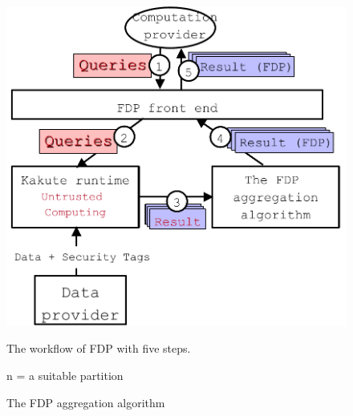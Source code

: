 \begin{figure}[!htb]
    \begin{minipage}{0.44\textwidth}
        \includegraphics[width=0.3\textheight]{figures/selective_arch.pdf}
        \vspace{-.1in}
        \caption{The workflow of FDP with five steps.}
        \label{fig:vm-tree}
    \end{minipage}
    \begin{minipage}{0.54\textwidth}
      \vspace{-.2in}
      \centering

      
      
      \begin{algorithm}[H] \label{algo:fdp}
\SetAlgoLined
{}
  n = a suitable partition

 \caption{The FDP aggregation algorithm}
 \label{algo:combined}
\end{algorithm}
      
      
      
      
    \vspace{-.1in}


\end{minipage}
    \vspace{-.1in}
\end{figure}

